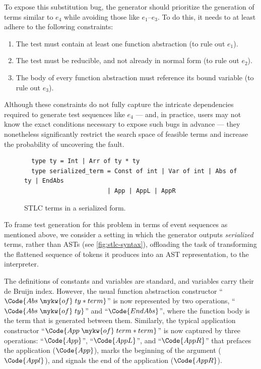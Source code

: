 To expose this substitution bug, the generator should prioritize the
generation of terms similar to $e_4$ while avoiding those like
$e_1$--$e_3$.  To do this, it needs to at least adhere to
the following constraints:
\begin{enumerate}
  \item The test must contain at least one function abstraction (to rule out $e_1$).
  \item The test must be reducible, and not already in normal form (to rule out $e_2$).
  \item The body of every function abstraction must reference its
    bound variable (to rule out $e_3$).
\end{enumerate}
Although these constraints do not fully capture the intricate
dependencies required to generate test sequences like $e_4$ — and,
in practice, users may not know the exact conditions necessary to
expose such bugs in advance — they nonetheless significantly restrict
the search space of feasible terms and increase the probability of
uncovering the fault.

\begin{figure}[th!]
\begin{verbatim}
  type ty = Int | Arr of ty * ty
  type serialized_term = Const of int | Var of int | Abs of ty | EndAbs
                       | App | AppL | AppR
\end{verbatim}
\vspace*{-.1in}
\caption{STLC terms in a serialized form.}
\label{fig:stlc-syntax}
\vspace*{-.1in}
\end{figure}

To frame test generation for this problem in terms of event sequences
as mentioned above, we consider a setting in which the generator
outputs \emph{serialized} terms, rather than ASTs (see
\autoref{fig:stlc-syntax}), offloading the task of transforming the
flattened sequence of tokens it produces into an AST representation,
to the interpreter.

The definitions of constants and variables are standard, and variables
carry their de Bruijn index. However, the usual function abstraction
constructor ``$\Code{Abs\;\mykw{of}\;ty * term}$'' is now represented
by two operations, ``$\Code{Abs\;\mykw{of}\;ty}$'' and
``$\Code{EndAbs}$'', where the function body is the term that is
generated between them.  Similarly, the typical application constructor
``$\Code{App\;\mykw{of}\;term * term}$'' is now captured by three
operations: ``$\Code{App}$'', ``$\Code{AppL}$'', and ``$\Code{AppR}$''
that prefaces the application ($\Code{App}$), marks the beginning of
the argument ($\Code{Appl}$), and signals the end of the application
($\Code{AppR}$).

